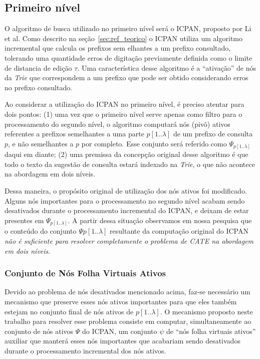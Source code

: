 \subsection{Primeiro nível}
\label{sec:first-level}

O algoritmo de busca utilizado no primeiro nível será o ICPAN, proposto por Li et al. Como descrito na seção~\ref{sec:ref_teorico} o ICPAN utiliza um algoritmo incremental que calcula os prefixos sem elhantes a um prefixo consultado, tolerando uma quantidade erros de digitação previamente definida como o limite de distancia de edição $\tau$. Uma característica desse algoritmo é a ``ativação'' de nós da \textit{Trie} que correspondem a um prefixo que pode ser obtido considerando erros no prefixo consultado.

Ao considerar a utilização do ICPAN no primeiro nível, é preciso atentar para dois pontos: (1) uma vez que o primeiro nível serve apenas como filtro para o processamento do segundo nível, o algoritmo computará nós (pivô) ativos referentes a prefixos semelhantes a uma parte $p[1..\lambda]$ de um prefixo de consulta $p$, e não semelhantes a $p$ por completo. Esse conjunto será referido como $\Psi_{p[1..\lambda]}$ daqui em diante; (2) uma premissa da concepção original desse algoritmo é que todo o texto da sugestão de consulta estará indexado na \textit{Trie}, o que não acontece na abordagem em dois níveis.

Dessa maneira, o propósito original de utilização dos nós ativos foi modificado. Alguns nós importantes para o processamento no segundo nível acabam sendo desativados durante o processamento incremental do ICPAN, e deixam de estar presentes em $\Psi_{p[1..\lambda]}$. A partir dessa situação observamos em nossa pesquisa que o conteúdo do conjunto $\Psi{p[1..\lambda]}$ resultante da computação original do ICPAN \textit{não é suficiente para resolver completamente o problema de CATE na abordagem em dois níveis}. 

\subsubsection{Conjunto de Nós Folha Virtuais Ativos}
\label{sec:virtual_leaves_node-set}

Devido ao problema de nós desativados mencionado acima, faz-se necessário um mecanismo que preserve esses nós ativos importantes para que eles também estejam no conjunto final de nós ativos de $p[1..\lambda]$. O mecanismo proposto neste trabalho para resolver esse problema consiste em computar, simultaneamente ao conjunto de nós ativos $\Psi$ do ICPAN, um conjunto $\psi$ de ``nós folha virtuais ativos'' auxiliar que manterá esses nós importantes que acabariam sendo desativados durante o processamento incremental dos nós ativos. 

